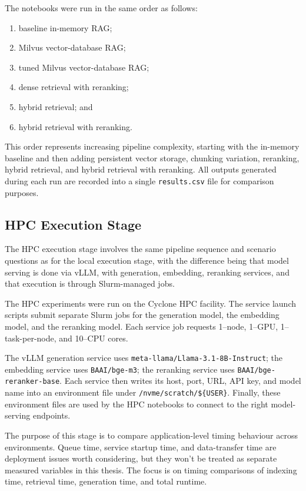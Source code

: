 The notebooks were run in the same order as follows:

\begin{enumerate}
    \item baseline in-memory \ac{RAG};
    \item Milvus vector-database \ac{RAG};
    \item tuned Milvus vector-database \ac{RAG};
    \item dense retrieval with reranking;
    \item hybrid retrieval; and
    \item hybrid retrieval with reranking.
\end{enumerate}

This order represents increasing pipeline complexity, starting with the in-memory baseline and then adding persistent vector storage, chunking variation, reranking, hybrid retrieval, and hybrid retrieval with reranking. All outputs generated during each run are recorded into a single \texttt{results.csv} file for comparison purposes.

\subsection{HPC Execution Stage}

The \ac{HPC} execution stage involves the same pipeline sequence and scenario questions as for the local execution stage, with the difference being that model serving is done via \ac{vLLM}, with generation, embedding, reranking services, and that execution is through Slurm-managed jobs.

The \ac{HPC} experiments were run on the Cyclone \ac{HPC} facility. The service launch scripts submit separate Slurm jobs for the generation model, the embedding model, and the reranking model. Each service job requests 1--node, 1--GPU, 1--task-per-node, and 10--CPU cores.

The \ac{vLLM} generation service uses \texttt{meta-llama/Llama-3.1-8B-Instruct}; the embedding service uses \texttt{BAAI/bge-m3}; the reranking service uses \texttt{BAAI/bge-reranker-base}. Each service then writes its host, port, URL, API key, and model name into an environment file under \texttt{/nvme/scratch/\$\{USER\}}. Finally, these environment files are used by the \ac{HPC} notebooks to connect to the right model-serving endpoints.

The purpose of this stage is to compare application-level timing behaviour across environments. Queue time, service startup time, and data-transfer time are deployment issues worth considering, but they won’t be treated as separate measured variables in this thesis. The focus is on timing comparisons of indexing time, retrieval time, generation time, and total runtime.

